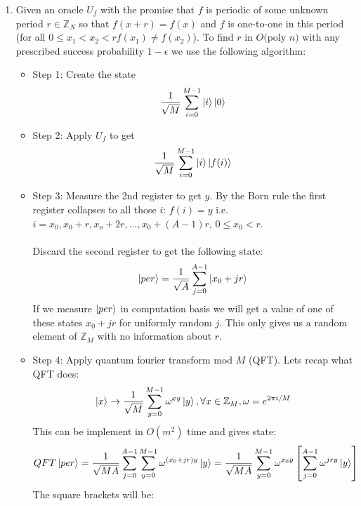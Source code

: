 \documentclass{article}
\begin{document}
\begin{enumerate}
        \item Given an oracle $U_f$ with the promise that $f$ is periodic of some unknown period $r \in \mathbb{Z}_N$ so that $f(x+r) = f(x)$ and $f$ is one-to-one in this period (for all $0 \leq x_1 < x_2<r f(x_1) \neq f(x_2)$). To find $r$ in $O($poly $n)$ with any prescribed success probability $1-\epsilon$ we use the following algorithm:
                \begin{itemize}
                        \item Step 1: Create the state 
                                $$
                                \frac{1}{\sqrt{M}} \sum_{i=0}^{M-1} \ket{i} \ket{0}
                                $$
                        \item Step 2: Apply $U_f$ to get
                                $$
                                \frac{1}{\sqrt{M}} \sum_{i=0}^{M-1} \ket{i} \ket{f(i)}
                                $$
                        \item Step 3: Measure the 2nd register to get $y$. By the Born rule the first register collapses to all those $i$: $f(i) =y$ i.e. $i = x_0, x_0 + r, x_o + 2r,..., x_0 + (A-1)r$, $0 \leq x_0 <r$.\\\\Discard the second register to get the following state:
                                $$
                                \ket{per} = \frac{1}{\sqrt{A}} \sum_{j=0}^{A-1} \ket{x_0 + jr}
                                $$
                         If we measure $\ket{per}$ in computation basis we will get a value of one of these states $x_0 + jr$ for uniformly random $j$. This only gives us a random element of $\mathbb{Z}_M$ with no information about $r$.
                        \item Step 4: Apply quantum fourier transform mod $M$ (QFT). Lets recap what QFT does:
                                $$
                                \ket{x} \rightarrow \frac{1}{\sqrt{M}} \sum_{y=0}^{M-1} \omega^{xy} \ket{y}, \forall x \in \mathbb{Z}_M, \omega = e^{2\pi i/ M}
                                $$
                                This can be implement in $O(m^2)$ time and gives state:
                                $$
                                QFT \ket{per} = \frac{1}{\sqrt{MA}} \sum_{j=0}^{A-1} \sum_{y=0}^{M-1}  \omega^{ (x_0 + jr)y} \ket{y} =  \frac{1}{\sqrt{MA}} \sum_{y=0}^{M-1} \omega^{x_0y}\left[  \sum_{j=0}^{A-1} \omega^{jry} \ket{y} \right]
                                $$
                        The square brackets will be:
                        $$
$$
\end{itemize}
\end{enumerate}
\end{document}
